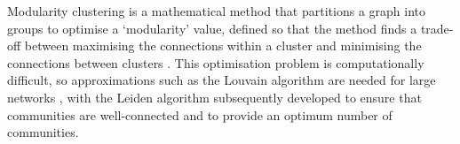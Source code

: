 Modularity clustering is a mathematical method that partitions a graph into groups to optimise a `modularity' value, defined so that the method finds a trade-off between maximising the connections within a cluster and minimising the connections between clusters \parencite{newmanModularityCommunityStructure2006}.
This optimisation problem is computationally difficult, so approximations such as the Louvain algorithm are needed for large networks \parencite{blondelFastUnfoldingCommunities2008}, with the Leiden algorithm \parencite{traagLouvainLeidenGuaranteeing2019} subsequently developed to ensure that communities are well-connected and to provide an optimum number of communities.

